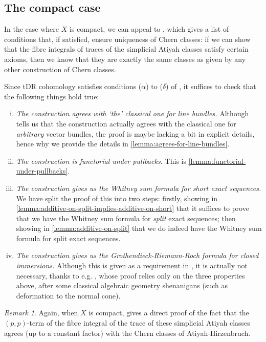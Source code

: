 \documentclass[11pt,fleqn]{article}
\theoremstyle{plain}
\theoremstyle{definition}
\theoremstyle{remark}
\newtheorem{remark}[theorem]{Remark}
\numberwithin{equation}{theorem}
\begin{document}
    \subsection{The compact case}\label{subsection:the-compact-case}

        In the case where $X$ is compact, we can appeal to \cite[Theorem~6.5]{Grivaux2009}, which gives a list of conditions that, if satisfied, ensure uniqueness of Chern classes: if we can show that the fibre integrals of traces of the simplicial Atiyah classes satisfy certain axioms, then we know that they are exactly the same classes as given by any other construction of Chern classes.

        Since tDR cohomology satisfies conditions ($\alpha$) to ($\delta$) of \cite[§6.2]{Grivaux2009}, it suffices to check that the following things hold true:
        \begin{enumerate}[(i)]
            \item \emph{The construction agrees with `the' classical one for line bundles.}
                Although \cite[Lemma~2.5]{Green1980} tells us that the construction actually agrees with the classical one for \emph{arbitrary} vector bundles, the proof is maybe lacking a bit in explicit details, hence why we provide the details in \cref{lemma:agrees-for-line-bundles}.
            \item \emph{The construction is functorial under pullbacks.}
                This is \cref{lemma:functorial-under-pullbacks}.
            \item \emph{The construction gives us the Whitney sum formula for short exact sequences.}
                We have split the proof of this into two steps: firstly, showing in \cref{lemma:additive-on-split-implies-additive-on-short} that it suffices to prove that we have the Whitney sum formula for \emph{split} exact sequences; then showing in \cref{lemma:additive-on-split} that we do indeed have the Whitney sum formula for split exact sequences.
            \item \emph{The construction gives us the Grothendieck-Riemann-Roch formula for closed immersions.}
                Although this is given as a requirement in \cite[Theorem~6.5]{Grivaux2009}, it is actually not necessary, thanks to e.g. \cite[Proposition~3.1]{Grivaux2012}, whose proof relies only on the three properties above, after some classical algebraic geometry shenanigans (such as deformation to the normal cone).
        \end{enumerate}

        \begin{remark}
            Again, when $X$ is compact, \cite[Lemma~2.7]{Green1980} gives a direct proof of the fact that the $(p,p)$-term of the fibre integral of the trace of these simplicial Atiyah classes agrees (up to a constant factor) with the Chern classes of Atiyah-Hirzenbruch.
        \end{remark}



\printbibliography
\end{document}
